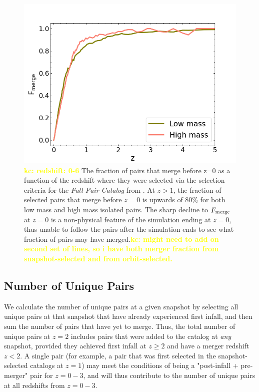 \documentclass[twocolumn,linenumbers]{aastex631}
\newcommand{\kc}[1]{\textcolor{yellow}{\textbf{kc: #1}} }
\newcommand{\paircat}{\textit{Full Pair Catalog}}
\begin{document}
\begin{figure}[htb]
    \begin{center}
    \includegraphics[width=\columnwidth]{plots/bet-on-it/1_fmerge_comp.png}
    \caption{\kc{redshift:  0-6} The fraction of pairs that merge before z=0 as a function of the redshift where they were selected via the selection criteria for the \paircat{} from \citet{Chamberlain2024}. At $z>1$, the fraction of selected pairs that merge before $z=0$ is upwards of 80\% for both low mass and high mass isolated pairs. The sharp decline to $F_{\rm merge}$ at $z=0$ is a non-physical feature of the simulation ending at $z=0$, thus unable to follow the pairs after the simulation ends to see what fraction of pairs may have merged.\kc{might need to add on second set of lines, so i have both merger fraction from snapshot-selected and from orbit-selected.}}
    \label{fig:fmerge}
    \end{center}
\end{figure}

\subsection{Number of Unique Pairs}
We calculate the number of unique pairs at a given snapshot by selecting all unique pairs at that snapshot that have already experienced first infall, and then sum the number of pairs that have yet to merge.
Thus, the total number of unique pairs at $z=2$ includes pairs that were added to the catalog at \textit{any} snapshot, provided they achieved first infall at $z\geq2$ and have a merger redshift $z<2$. 
A single pair (for example, a pair that was first selected in the snapshot-selected catalogs at $z=1$) may meet the conditions of being a "post-infall + pre-merger" pair for $z=0-3$, and will thus contribute to the number of unique pairs at all redshifts from $z=0-3$. 
\end{document}
